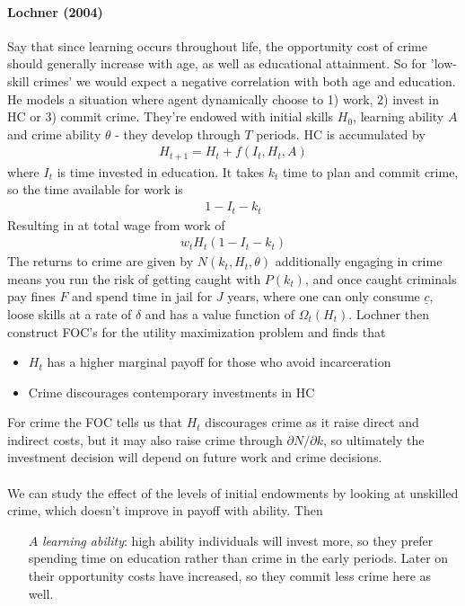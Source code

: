 \documentclass[12pt, a4paper]{article}
\begin{document}
\begin{multicols}{2}
\paragraph{Lochner (2004)} Say that since learning occurs throughout life, the opportunity cost of crime should generally increase with age, as well as educational attainment. So for 'low-skill crimes' we would expect a negative correlation with both age and education. He models a situation where agent dynamically choose to 1) work, 2) invest in HC or 3) commit crime. They're endowed with initial skills $H_0$, learning ability $A$ and crime ability $\theta$ - they develop through $T$ periods. HC is accumulated by
\begin{align*}
H_{t+1} = H_t + f(I_t, H_t, A)
\end{align*}
where $I_t$ is time invested in education. It takes $k_t$ time to plan and commit crime, so the time available for work is 
\begin{align*}
1-I_t - k_t
\end{align*}
Resulting in at total wage from work of 
\begin{align*}
w_t H_t (1- I_t - k_t) 
\end{align*}
The returns to crime are given by $N(k_t, H_t, \theta)$ additionally engaging in crime means you run the risk of getting caught with $P(k_t)$, and once caught criminals pay fines $F$ and spend time in jail for $J$ years, where one can only consume $\underline{c}$, loose skills at a rate of $\delta$ and has a value function of $\Omega_t(H_t)$. Lochner then construct FOC's for the utility maximization problem and finds that 
\begin{itemize}
\item $H_t$ has a higher marginal payoff for those who avoid incarceration
\item Crime discourages contemporary investments in HC
\end{itemize}
For crime the FOC tells us that $H_t$ discourages crime as it raise direct and indirect costs, but it may also raise crime through $\partial N / \partial k$, so ultimately the investment decision will depend on future work and crime decisions.
\\ \\
We can study the effect of the levels of initial endowments by looking at unskilled crime, which doesn't improve in payoff with ability. Then 
\begin{itemize}
\item[$A$] \textit{learning ability}: high ability individuals will invest more, so they prefer spending time on education rather than crime in the early periods. Later on their opportunity costs have increased, so they commit less crime here as well.

\end{itemize}
\end{multicols}
\end{document}
